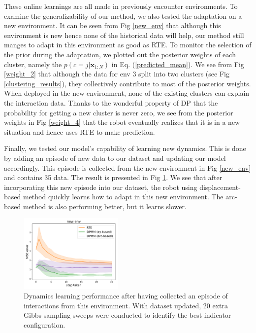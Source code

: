 These online learnings are all made in previously encounter environments.
To examine the generalizability of our method, we also tested the adaptation on a new environment.
It can be seen from Fig \ref{new_env} that although this environment is new hence none of the historical data will help, our method still manges to adapt in this environment as good as RTE.
To monitor the selection of the prior during the adaptation, we plotted out the posterior weights of each cluster, namely the $p(c=j| \bm{x}_{1:N})$ in Eq. (\ref{predicted_mean}).
We see from Fig \ref{weight_2} that although the data for env 3 split into two clusters (see Fig \ref{clustering_results}), they collectively contribute to most of the posterior weights.
When deployed in the new environment, none of the existing clusters can explain the interaction data.
Thanks to the wonderful property of DP that the probability for getting a new cluster is never zero, we see from the posterior weights in Fig \ref{weight_4} that the robot eventually realizes that it is in a new situation and hence uses RTE to make prediction.


Finally, we tested our model's capability of learning new dynamics.
This is done by adding an episode of new data to our dataset and updating our model accordingly.
This episode is collected from the new environment in Fig \ref{new_env} and contains 35 data.
The result is presented in Fig \ref{new_adapt}.
We see that after incorporating this new episode into our dataset, the robot using displacement-based method quickly learns how to adapt in this new environment.
The arc-based method is also performing better, but it learns slower.

\begin{figure}[h]
\centering
\includegraphics[width=0.45\textwidth]{new_case4.pdf}
\caption{Dynamics learning performance after having collected an episode of interactions from this environment.
With dataset updated, 20 extra Gibbs sampling sweeps were conducted to identify the best indicator configuration.}
\label{new_adapt}
\end{figure}


